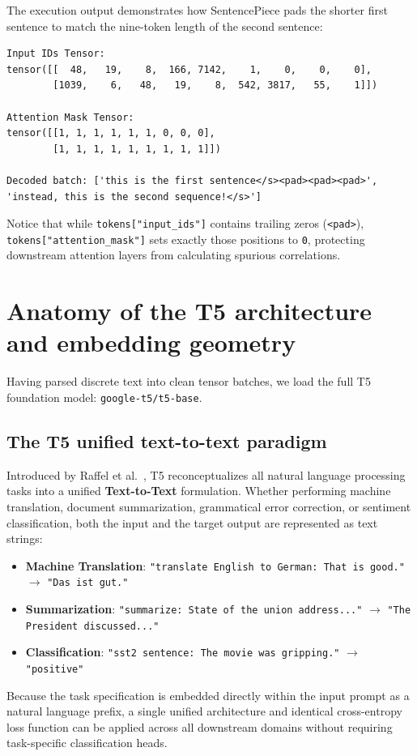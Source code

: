 \documentclass[../labs.tex]{subfiles}
\begin{document}
The execution output demonstrates how SentencePiece pads the shorter first sentence to match the nine-token length of the second sentence:
\begin{lstlisting}[style=terminalOutput]
Input IDs Tensor:
tensor([[  48,   19,    8,  166, 7142,    1,    0,    0,    0],
        [1039,    6,   48,   19,    8,  542, 3817,   55,    1]])

Attention Mask Tensor:
tensor([[1, 1, 1, 1, 1, 1, 0, 0, 0],
        [1, 1, 1, 1, 1, 1, 1, 1, 1]])

Decoded batch: ['this is the first sentence</s><pad><pad><pad>', 'instead, this is the second sequence!</s>']
\end{lstlisting}

Notice that while \texttt{tokens["input\_ids"]} contains trailing zeros (\texttt{<pad>}), \texttt{tokens["attention\_mask"]} sets exactly those positions to \texttt{0}, protecting downstream attention layers from calculating spurious correlations.

\section{Anatomy of the T5 architecture and embedding geometry}
\label{sec:lab02_t5_anatomy}

Having parsed discrete text into clean tensor batches, we load the full T5 foundation model: \texttt{google-t5/t5-base}.

\subsection{The T5 unified text-to-text paradigm}

Introduced by Raffel et al.~\cite{raffel2020t5}, T5 reconceptualizes all natural language processing tasks into a unified \textbf{Text-to-Text} formulation. Whether performing machine translation, document summarization, grammatical error correction, or sentiment classification, both the input and the target output are represented as text strings:
\begin{itemize}
    \item \textbf{Machine Translation}: \texttt{"translate English to German: That is good."} $\longrightarrow$ \texttt{"Das ist gut."}
    \item \textbf{Summarization}: \texttt{"summarize: State of the union address..."} $\longrightarrow$ \texttt{"The President discussed..."}
    \item \textbf{Classification}: \texttt{"sst2 sentence: The movie was gripping."} $\longrightarrow$ \texttt{"positive"}
\end{itemize}
Because the task specification is embedded directly within the input prompt as a natural language prefix, a single unified architecture and identical cross-entropy loss function can be applied across all downstream domains without requiring task-specific classification heads.
\end{document}
